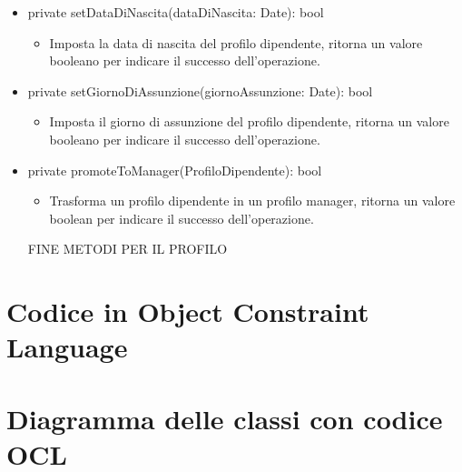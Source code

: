 \documentclass{report}
\begin{document}
\begin{itemize}
\item private  setDataDiNascita(dataDiNascita: Date): bool
\begin{itemize}
    \item Imposta la data di nascita del profilo dipendente, ritorna un valore booleano per indicare il successo dell'operazione.
\end{itemize}
\item private setGiornoDiAssunzione(giornoAssunzione: Date): bool
\begin{itemize}
    \item Imposta il giorno di assunzione del profilo dipendente, ritorna un valore booleano per indicare il successo dell'operazione.
\end{itemize}
\item private promoteToManager(ProfiloDipendente): bool
\begin{itemize}
    \item Trasforma un profilo dipendente in un profilo manager, ritorna un valore boolean per indicare il successo dell'operazione.
\end{itemize}
FINE METODI PER IL PROFILO
\fi

\end{itemize}











\chapter{Codice in Object Constraint Language}	
	
\chapter{Diagramma delle classi con codice OCL}
	
\end{document}
